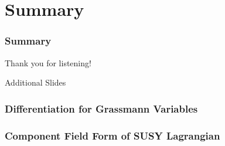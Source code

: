 \documentclass[10pt,aspectratio=169]{beamer}
\begin{document}
\section{Summary}

\begin{frame}
  \frametitle{Summary}

  \begin{center}
    \large Thank you for listening!
  \end{center}

\end{frame}

\appendix

\begin{frame}
  \begin{center}
    {
      \Large
      Additional Slides
    }
  \end{center}
\end{frame}


\begin{frame}
  \frametitle{Differentiation for Grassmann Variables}
\end{frame}

\begin{frame}
  \frametitle{Component Field Form of SUSY Lagrangian}
\end{frame}
\end{document}
